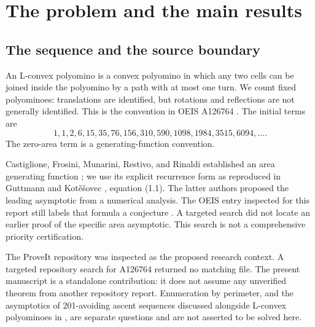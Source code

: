 \documentclass[11pt]{article}
\numberwithin{equation}{section}
\theoremstyle{definition}\newtheorem{definition}[theorem]{Definition}
\theoremstyle{remark}\newtheorem{remark}[theorem]{Remark}
\begin{document}
\section{The problem and the main results}
\subsection{The sequence and the source boundary}
An L-convex polyomino is a convex polyomino in which any two cells can be
joined inside the polyomino by a path with at most one turn.
We count fixed polyominoes: translations are identified, but rotations
and reflections are not generally identified. This is the convention in
OEIS A126764 \cite{oeis}. The initial terms are
\[
1,1,2,6,15,35,76,156,310,590,1098,1984,3515,6094,\ldots.
\]
The zero-area term is a generating-function convention.

Castiglione, Frosini, Munarini, Restivo, and Rinaldi established an area
generating function \cite{castiglione}; we use its explicit recurrence form
as reproduced in Guttmann and Kot\v e\v sovec \cite{gk}, equation (1.1).
The latter authors proposed the leading asymptotic from a numerical
analysis. The OEIS entry inspected for this report still labels that
formula a conjecture \cite{oeis}. A targeted search did not locate an
earlier proof of the specific area asymptotic. This search is not a
comprehensive priority certification.

The ProveIt repository \cite{proveit} was inspected as the proposed research
context. A targeted repository search for A126764 returned no matching
file. The present manuscript is a standalone contribution: it does not
assume any unverified theorem from another repository report. Enumeration
by perimeter, and the asymptotics of 201-avoiding ascent sequences discussed
alongside L-convex polyominoes in \cite{gk}, are separate questions and are
not asserted to be solved here.
\end{document}
